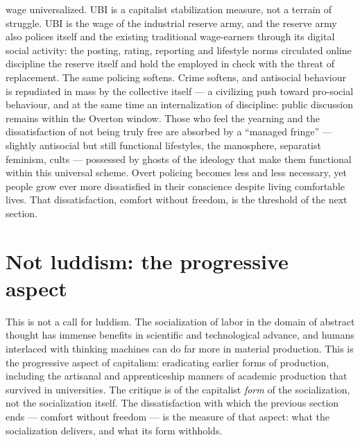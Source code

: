 \documentclass[11pt]{article}
\begin{document}
wage universalized. UBI is a capitalist stabilization measure, not a
terrain of struggle. UBI is the wage of the industrial reserve army,
and the reserve army also polices itself and the existing traditional
wage-earners through its digital social activity: the posting, rating,
reporting and lifestyle norms circulated online discipline the reserve
itself and hold the employed in check with the threat of replacement.
The same policing softens. Crime softens, and antisocial behaviour is
repudiated in mass by the collective itself --- a civilizing push toward
pro-social behaviour, and at the same time an internalization of
discipline: public discussion remains within the Overton window. Those
who feel the yearning and the dissatisfaction of not being truly free
are absorbed by a ``managed fringe'' --- slightly antisocial but still
functional lifestyles, the manosphere, separatist feminism, cults ---
possessed by ghosts of the ideology that make them functional within
this universal scheme. Overt policing becomes less and less necessary,
yet people grow ever more dissatisfied in their conscience despite
living comfortable lives. That dissatisfaction, comfort without freedom,
is the threshold of the next section.

\section{Not luddism: the progressive aspect}

This is not a call for luddism. The socialization of labor in the
domain of abstract thought has immense benefits in scientific and
technological advance, and humans interlaced with thinking machines can
do far more in material production. This is the progressive aspect of
capitalism: eradicating earlier forms of production, including the
artisanal and apprenticeship manners of academic production that
survived in universities. The critique is of the capitalist \emph{form}
of the socialization, not the socialization itself. The dissatisfaction
with which the previous section ends --- comfort without freedom --- is
the measure of that aspect: what the socialization delivers, and what
its form withholds.
\end{document}
